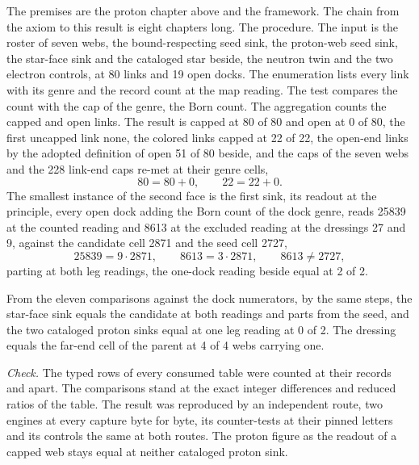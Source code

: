 \begin{chproof}
The premises are the proton chapter above and the framework. The chain from the axiom to this result is eight chapters long. The procedure. The input is the roster of seven webs, the bound-respecting seed sink, the proton-web seed sink, the star-face sink and the cataloged star beside, the neutron twin and the two electron controls, at 80 links and 19 open docks. The enumeration lists every link with its genre and the record count at the map reading. The test compares the count with the cap of the genre, the Born count. The aggregation counts the capped and open links. The result is capped at 80 of 80 and open at 0 of 80, the first uncapped link none, the colored links capped at 22 of 22, the open-end links by the adopted definition of open 51 of 80 beside, and the caps of the seven webs and the 228 link-end caps re-met at their genre cells,
\begin{equation}
80 = 80 + 0, \qquad 22 = 22 + 0 .
\end{equation}
The smallest instance of the second face is the first sink, its readout at the principle, every open dock adding the Born count of the dock genre, reads 25839 at the counted reading and 8613 at the excluded reading at the dressings 27 and 9, against the candidate cell 2871 and the seed cell 2727,
\begin{equation}
25839 = 9 \cdot 2871, \qquad 8613 = 3 \cdot 2871, \qquad 8613 \neq 2727 ,
\end{equation}
parting at both leg readings, the one-dock reading beside equal at 2 of 2.

From the eleven comparisons against the dock numerators, by the same steps, the star-face sink equals the candidate at both readings and parts from the seed, and the two cataloged proton sinks equal at one leg reading at 0 of 2. The dressing equals the far-end cell of the parent at 4 of 4 webs carrying one.

\emph{Check.} The typed rows of every consumed table were counted at their records and apart. The comparisons stand at the exact integer differences and reduced ratios of the table. The result was reproduced by an independent route, two engines at every capture byte for byte, its counter-tests at their pinned letters and its controls the same at both routes.
The proton figure as the readout of a capped web stays equal at neither cataloged proton sink.
\end{chproof}
\label{chend:VII-4-D535254-w-prca}
\par\medskip{}\label{narr:close:7-4}\par
